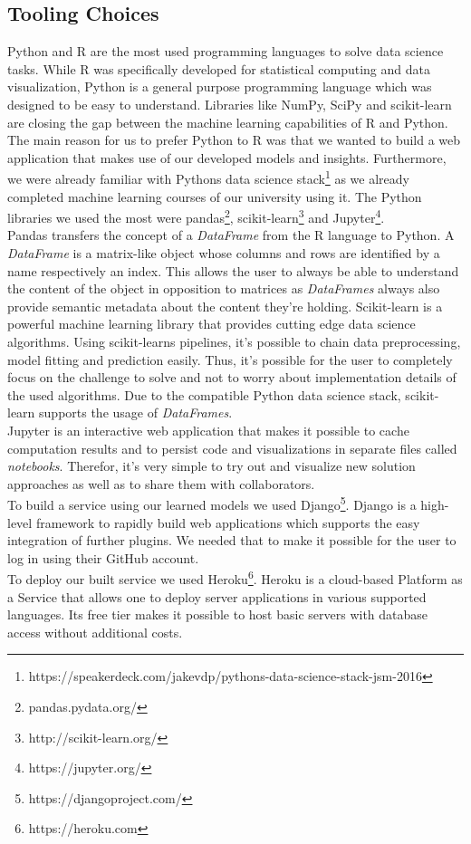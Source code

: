 \documentclass[%
a4paper,
DIV12,
2.5headlines,
bigheadings,
titlepage,
openbib,
]{scrartcl}
\begin{document}
\subsection{Tooling Choices}\label{tooling-choices}
Python and R are the most used programming languages to solve data science tasks.
While R was specifically developed for statistical computing and data visualization, Python is a general purpose programming language which was designed to be easy to understand.
Libraries like NumPy, SciPy and scikit-learn are closing the gap between the machine learning capabilities of R and Python.
The main reason for us to prefer Python to R was that we wanted to build a web application that makes use of our developed models and insights.
Furthermore, we were already familiar with Pythons data science stack\footnote{https://speakerdeck.com/jakevdp/pythons-data-science-stack-jsm-2016} as we already completed machine learning courses of our university using it.
The Python libraries we used the most were pandas\footnote{pandas.pydata.org/}, scikit-learn\footnote{http://scikit-learn.org/} and Jupyter\footnote{https://jupyter.org/}.\\
Pandas transfers the concept of a \textit{DataFrame} from the R language to Python.
A \textit{DataFrame} is a matrix-like object whose columns and rows are identified by a name respectively an index.
This allows the user to always be able to understand the content of the object in opposition to matrices as \textit{DataFrames} always also provide semantic metadata about the content they're holding.
Scikit-learn is a powerful machine learning library that provides cutting edge data science algorithms.
Using scikit-learns pipelines, it's possible to chain data preprocessing, model fitting and prediction easily.
Thus, it's possible for the user to completely focus on the challenge to solve and not to worry about implementation details of the used algorithms.
Due to the compatible Python data science stack, scikit-learn supports the usage of \textit{DataFrames}.\\
Jupyter is an interactive web application that makes it possible to cache computation results and to persist code and visualizations in separate files called \textit{notebooks}.
Therefor, it's very simple to try out and visualize new solution approaches as well as to share them with collaborators.\\
To build a service using our learned models we used Django\footnote{https://djangoproject.com/}.
Django is a high-level framework to rapidly build web applications which supports the easy integration of further plugins.
We needed that to make it possible for the user to log in using their GitHub account.\\
To deploy our built service we used Heroku\footnote{https://heroku.com}.
Heroku is a cloud-based Platform as a Service that allows one to deploy server applications in various supported languages.
Its free tier makes it possible to host basic servers with database access without additional costs.
\end{document}
